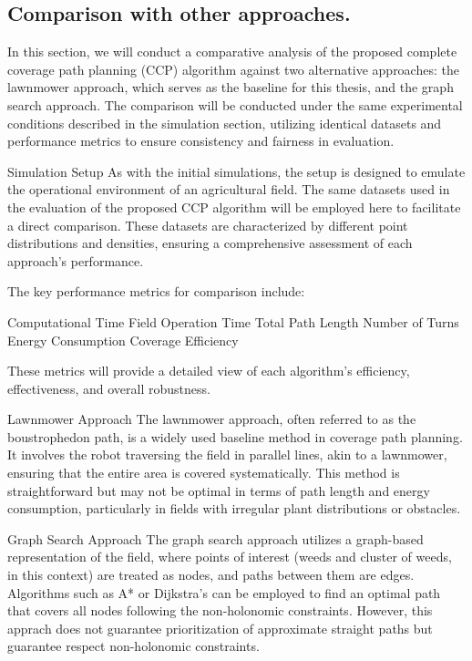 
\subsection{Comparison with other approaches.}

In this section, we will conduct a comparative analysis of the proposed complete coverage path planning (CCP) algorithm against two alternative approaches: the lawnmower approach, which serves as the baseline for this thesis, and the graph search approach. The comparison will be conducted under the same experimental conditions described in the simulation section, utilizing identical datasets and performance metrics to ensure consistency and fairness in evaluation.

\vspace*{6mm}   

Simulation Setup
As with the initial simulations, the setup is designed to emulate the operational environment of an agricultural field. The same datasets used in the evaluation of the proposed CCP algorithm will be employed here to facilitate a direct comparison. These datasets are characterized by different point distributions and densities, ensuring a comprehensive assessment of each approach’s performance.

\vspace*{6mm}   

The key performance metrics for comparison include:

Computational Time
Field Operation Time
Total Path Length
Number of Turns
Energy Consumption
Coverage Efficiency


These metrics will provide a detailed view of each algorithm's efficiency, effectiveness, and overall robustness.

\vspace*{6mm}   

Lawnmower Approach
The lawnmower approach, often referred to as the boustrophedon path, is a widely used baseline method in coverage path planning. It involves the robot traversing the field in parallel lines, akin to a lawnmower, ensuring that the entire area is covered systematically. This method is straightforward but may not be optimal in terms of path length and energy consumption, particularly in fields with irregular plant distributions or obstacles.

\vspace*{6mm}   

Graph Search Approach
The graph search approach utilizes a graph-based representation of the field, where points of interest (weeds and cluster of weeds, in this context) are treated as nodes, and paths between them are edges. Algorithms such as A* or Dijkstra's can be employed to find an optimal path that covers all nodes following the non-holonomic constraints. However, this apprach does not guarantee 
prioritization of approximate straight paths but guarantee respect non-holonomic constraints. 


